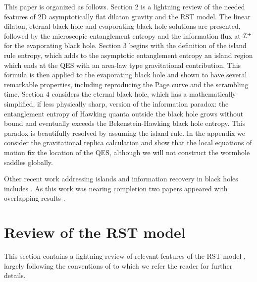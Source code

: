 \documentclass[12pt,oneside,letterpaper]{article}
\numberwithin{equation}{section}
\begin{document}
This paper is organized as follows. Section 2 is a lightning review of the needed features of 2D asymptotically flat dilaton gravity and the RST model.  The linear dilaton, eternal black hole and evaporating black hole solutions are presented, followed by  the microscopic entanglement entropy and the information flux at
${\cal I}^+$ for the evaporating black hole. Section 3 begins with the definition of the island rule entropy, which  adds to the asymptotic entanglement entropy an island region which ends at the QES with an area-law type gravitational contribution. This formula is then applied to the evaporating black hole and shown to have several remarkable properties, including reproducing the Page curve and the scrambling time.  Section 4 considers the 
eternal black hole, which has a mathematically simplified, if less physically sharp, version of the information paradox: the entanglement entropy of Hawking quanta outside the black hole grows without bound and eventually exceeds the Bekenstein-Hawking black hole entropy. This paradox is beautifully resolved by assuming the island rule.  In the appendix we consider the gravitational replica calculation and show that the local equations of motion fix the location of the QES, although we will not construct the wormhole saddles globally.




 Other recent work addressing islands and information recovery in black holes includes \cite{Zhao:2019nxk, Akers:2019nfi, Rozali:2019day, Chen:2019uhq, Bousso:2019ykv, Almheiri:2019psy, Chen:2019iro, Laddha:2020kvp, Mousatov:2020ics, Kim:2020cds, Saraswat:2020zzf, Chen:2020wiq, Marolf:2020xie, Verlinde:2020upt, Jana:2020vyx, Giddings:2020yes, Liu:2020gnp, Pollack:2020gfa, Balasubramanian:2020hfs}. As this work was nearing completion two  papers appeared with overlapping results \cite{Gautason:2020tmk,Anegawa:2020ezn}.



\section{Review of the RST model}


This section contains a lightning review of relevant features of the RST model \cite{Russo:1992ax}, largely following the conventions of \cite{Fiola:1994ir}
to which we refer the reader for further details. 
\end{document}
